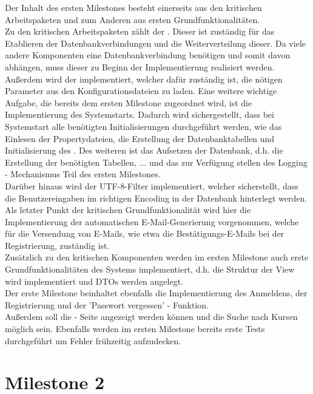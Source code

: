 Der Inhalt des ersten Milestones besteht einerseits aus den kritischen Arbeitspaketen und zum Anderen aus
ersten Grundfunktionalitäten.\\
Zu den kritischen Arbeitspaketen zählt der . Dieser ist zuständig für das Etablieren der Datenbankverbindungen und die Weiterverteilung dieser. Da viele andere Komponenten eine Datenbankverbindung benötigen und somit davon abhängen, muss dieser zu Beginn der Implementierung realisiert werden.\\
Außerdem wird der  implementiert, welcher dafür zuständig ist, die nötigen Parameter aus den Konfigurationsdateien zu laden.
Eine weitere wichtige Aufgabe, die bereits dem ersten Milestone zugeordnet wird, ist die
Implementierung des Systemstarts. Dadurch wird sichergestellt, dass bei Systemstart alle
benötigten Initialisierungen durchgeführt werden, wie das Einlesen der Propertydateien, die Erstellung der Datenbanktabellen und Initialisierung des .
Des weiteren ist das Aufsetzen der Datenbank, d.h. die Erstellung der benötigten Tabellen, ... und das zur Verfügung stellen des Logging - Mechanismus Teil des ersten Milestones.\\
Darüber hinaus wird der  UTF-8-Filter implementiert, welcher sicherstellt, dass die Benutzereingaben
im richtigen Encoding in der Datenbank hinterlegt werden.\\
Als letzter Punkt der kritischen Grundfunktionalität wird hier die Implementierung der automatischen E-Mail-Generierung vorgenommen, welche für die Versendung von E-Mails, wie etwa die Bestätigungs-E-Mails bei der Registrierung, zuständig ist.\\ 
Zusätzlich zu den kritischen Komponenten werden im ersten Milestone auch erste Grundfunktionalitäten des Systems implementiert, d.h. die Struktur der View wird implementiert und DTOs werden angelegt.\\
Der erste Milestone beinhaltet ebenfalls die Implementierung des Anmeldens, der Registrierung und der 'Passwort vergessen' - Funktion.\\
Außerdem soll die  - Seite angezeigt werden können und die Suche nach Kursen möglich sein.
Ebenfalls werden im ersten Milestone  bereits erste Tests durchgeführt um Fehler frühzeitig aufzudecken.\\

\section{Milestone 2}

